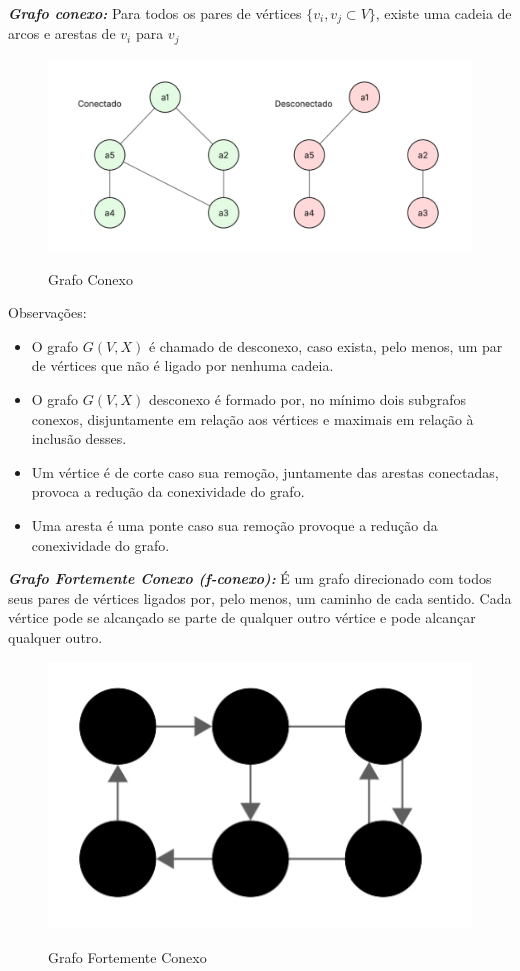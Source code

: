 \textit{\textbf{Grafo conexo:}} Para todos os pares de vértices $\{v_i, v_j \subset V\}$, existe uma cadeia de arcos e arestas de $v_i$ para $v_j$

\begin{figure} [H]
	\centering
	\caption{Grafo Conexo}%
	\label{fig:conexo}%
	\includegraphics[width=0.8\linewidth,angle=0]{figuras/grafo_conexo.png}%
	\\
\end{figure}

Observações:
\begin{itemize}
    \item O grafo $G(V, X)$ é chamado de desconexo, caso exista, pelo menos, um par de vértices que não é ligado por nenhuma cadeia.
    \item O grafo $G(V, X)$ desconexo é formado por, no mínimo dois subgrafos conexos, disjuntamente em relação aos vértices e maximais em relação à inclusão desses.
    \item Um vértice é de corte caso sua remoção, juntamente das arestas conectadas, provoca a redução da conexividade do grafo.
    \item Uma aresta é uma ponte caso sua remoção provoque a redução da conexividade do grafo.
\end{itemize}

\textit{\textbf{Grafo Fortemente Conexo (f-conexo):}} É um grafo direcionado com todos seus pares de vértices ligados por, pelo menos, um caminho de cada sentido. Cada vértice pode se alcançado se parte de qualquer outro vértice e pode alcançar qualquer outro.

\begin{figure} [H]
	\centering
	\caption{Grafo Fortemente Conexo}%
	\label{fig:f-conexo}%
	\includegraphics[width=0.4\linewidth,angle=0]{figuras/forte.png}%
	\\
\end{figure}


